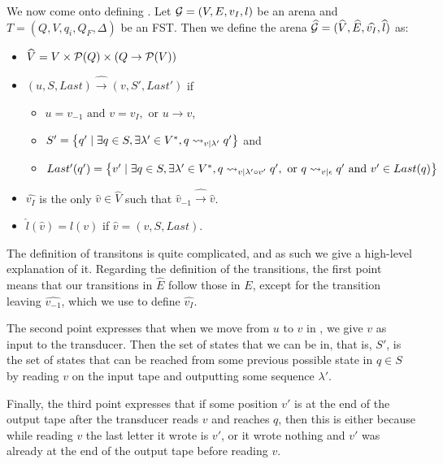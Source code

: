 \documentclass[10pt, a4paper]{report}
\begin{document}
\bigskip

We now come onto defining . Let $\mathcal{G} = (V, E, v_I, l)$ be an arena and
$T = (Q, V, q_i, Q_F, \Delta)$ be an FST. Then we define the arena
$\widehat{\mathcal{G}} = (\widehat{V}, \widehat{E}, \widehat{v_I}, \widehat{l})$ as:

\begin{itemize}
\item $\widehat{V} = V \times \mathcal{P}(Q) \times (Q \rightarrow \mathcal{P}(V))$
\item $(u, S, Last) \widehat{\rightarrow} (v, S', Last')$ if
  \begin{itemize}
  \item $u = v_{-1} \text{ and } v = v_I, \text{ or } u \rightarrow v$,
  \item $S' = \left\{q' \mid \exists q \in S, \exists \lambda' \in V^\ast, q
      \rightsquigarrow_{v \mid \lambda'} q' \right\}$ and
  \item $Last' (q') = \left\{ v' \mid \exists q \in S, \exists \lambda' \in
      V^\ast, q \rightsquigarrow_{v \mid \lambda' \circ v'} q', \text{ or } q \rightsquigarrow_{v \mid
        \epsilon} q' \text{ and } v' \in Last(q) \right\}$
  \end{itemize}
\item $\widehat{v_I}$ is the only $\widehat{v} \in \widehat{V}$ such that
  $\widehat{v}_{-1} \widehat{\rightarrow} \widehat{v}$.
\item $\widehat{l}(\widehat{v}) = l (v)$ if $\widehat{v}= (v, S, Last)$. 
\end{itemize}

The definition of transitons is quite complicated, and as such we give a high-level
explanation of it. Regarding the definition of the transitions,
the first point means that our transitions in $\widehat{E}$ follow those in $E$,
except for the transition leaving $\widehat{v_{-1}}$, which we use to define
$\widehat{v_I}$. 

The second point expresses that when we move from $u$ to $v$ in , we give
$v$ as input to the transducer. Then the set of states that we can be in, that
is, $S'$, is the set of states that can be reached from some previous possible
state in $q \in S$ by reading $v$ on the input tape and outputting some sequence
$\lambda'$.

Finally, the third point expresses that if some position $v'$ is at the end of
the output tape after the transducer reads $v$ and reaches $q$, then this is either
because while reading $v$ the last letter it wrote is $v'$, or it wrote nothing
and $v'$ was already at the end of the output tape before reading $v$. 
\end{document}
